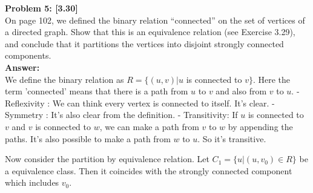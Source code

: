 \documentclass{article}
\begin{document}
{\bf Problem 5: [3.30]}\\
On page 102, we defined the binary relation “connected” on the set of vertices of a directed graph. Show that this is an equivalence relation (see Exercise 3.29), and conclude that it partitions the vertices into disjoint strongly connected components.\\
{\bf Answer:}\\
We define the binary relation as $R=\{(u,v)|u $ is connected to $v\}$.
Here the term 'connected' means that there is a path from $u$ to $v$ and also from $v$ to $u$.
- Reflexivity : We can think every vertex is connected to itself. It's clear.
- Symmetry : It's also clear from the definition. 
- Transitivity: If $u$ is connected to $v$ and $v$ is connected to $w$, we can make a path from $v$ to $w$ by appending the paths. It's also possible to make a path from $w$ to $u$. So it's transitive.

Now consider the partition by equivalence relation. Let $C_1=\{u|(u,v_0)\in R\}$ be a equivalence class. Then it coincides with the strongly connected component which includes $v_0$.\\
\pagebreak
\end{document}
